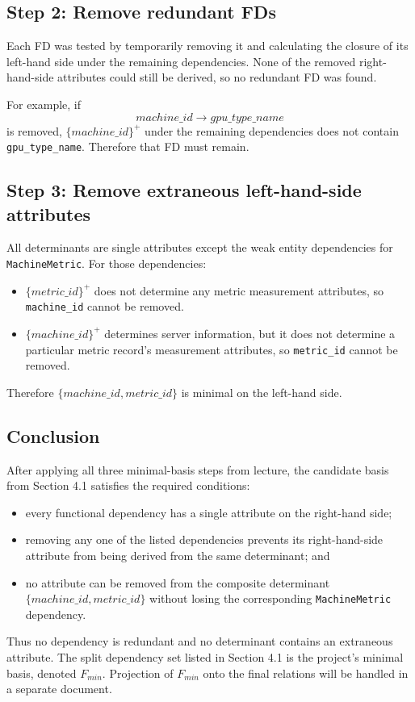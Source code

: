 \documentclass[11pt]{article}
\newcommand{\fd}{\rightarrow}
\newcommand{\code}[1]{\texttt{#1}}
\begin{document}
\subsection{Step 2: Remove redundant FDs}

Each FD was tested by temporarily removing it and calculating the closure of its left-hand side under the remaining dependencies. None of the removed right-hand-side attributes could still be derived, so no redundant FD was found.

For example, if
\[
machine\_id \fd gpu\_type\_name
\]
is removed, $\{machine\_id\}^{+}$ under the remaining dependencies does not
contain \code{gpu\_type\_name}. Therefore that FD must remain.

\subsection{Step 3: Remove extraneous left-hand-side attributes}

All determinants are single attributes except the weak entity dependencies for
\code{MachineMetric}. For those dependencies:

\begin{itemize}
    \item $\{metric\_id\}^{+}$ does not determine any metric measurement
          attributes, so \code{machine\_id} cannot be removed.
    \item $\{machine\_id\}^{+}$ determines server information, but it does not
          determine a particular metric record's measurement attributes, so
          \code{metric\_id} cannot be removed.
\end{itemize}

Therefore $\{machine\_id, metric\_id\}$ is minimal on the left-hand side.

\subsection{Conclusion}

After applying all three minimal-basis steps from lecture, the candidate basis from Section 4.1 satisfies the required conditions:

\begin{itemize}
    \item every functional dependency has a single attribute on the right-hand side;
    \item removing any one of the listed dependencies prevents its right-hand-side
          attribute from being derived from the same determinant; and
    \item no attribute can be removed from the composite determinant
          $\{machine\_id, metric\_id\}$ without losing the corresponding
          \code{MachineMetric} dependency.
\end{itemize}

Thus no dependency is redundant and no determinant contains an extraneous
attribute. The split dependency set listed in Section 4.1 is the project's
minimal basis, denoted $F_{min}$. Projection of $F_{min}$ onto the final relations will be handled in a separate document.
\end{document}
